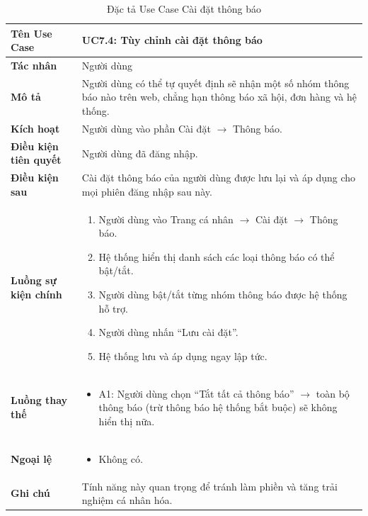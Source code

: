 \begin{table}[H]
\centering
\begin{tabularx}{\textwidth}{|l|X|}
\hline
\textbf{Tên Use Case} & \textbf{UC7.4: Tùy chỉnh cài đặt thông báo} \\ \hline
\textbf{Tác nhân} & Người dùng \\ \hline
\textbf{Mô tả} & Người dùng có thể tự quyết định sẽ nhận một số nhóm thông báo nào trên web, chẳng hạn thông báo xã hội, đơn hàng và hệ thống. \\ \hline
\textbf{Kích hoạt} & Người dùng vào phần Cài đặt $\rightarrow$ Thông báo. \\ \hline
\textbf{Điều kiện tiên quyết} & Người dùng đã đăng nhập. \\ \hline
\textbf{Điều kiện sau} & Cài đặt thông báo của người dùng được lưu lại và áp dụng cho mọi phiên đăng nhập sau này. \\ \hline
\textbf{Luồng sự kiện chính} & 
\begin{enumerate}
    \item Người dùng vào Trang cá nhân $\rightarrow$ Cài đặt $\rightarrow$ Thông báo.
    \item Hệ thống hiển thị danh sách các loại thông báo có thể bật/tắt.
    \item Người dùng bật/tắt từng nhóm thông báo được hệ thống hỗ trợ.
    \item Người dùng nhấn ``Lưu cài đặt''.
    \item Hệ thống lưu và áp dụng ngay lập tức.
\end{enumerate} \\ \hline
\textbf{Luồng thay thế} & 
\begin{itemize}
    \item A1: Người dùng chọn ``Tắt tất cả thông báo'' $\rightarrow$ toàn bộ thông báo (trừ thông báo hệ thống bắt buộc) sẽ không hiển thị nữa.
\end{itemize} \\ \hline
\textbf{Ngoại lệ} & 
\begin{itemize}
    \item Không có.
\end{itemize} \\ \hline
\textbf{Ghi chú} & Tính năng này quan trọng để tránh làm phiền và tăng trải nghiệm cá nhân hóa. \\ \hline
\end{tabularx}
\caption{Đặc tả Use Case Cài đặt thông báo}
\end{table}
